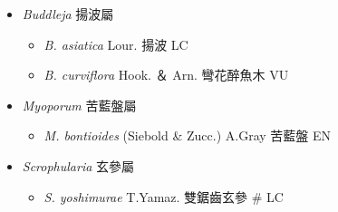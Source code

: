 
  \begin{itemize}
 \item[] \textit{Buddleja} 揚波屬
                                
  \begin{itemize}
        \item[] \textit{B. asiatica} Lour.  揚波   LC
        \item[] \textit{B. curviflora} Hook. ＆ Arn.  彎花醉魚木   VU
  \end{itemize}
 \item[] \textit{Myoporum} 苦藍盤屬
                                
  \begin{itemize}
        \item[] \textit{M. bontioides} (Siebold \& Zucc.) A.Gray  苦藍盤   EN
  \end{itemize}
 \item[] \textit{Scrophularia} 玄參屬
                                
  \begin{itemize}
        \item[] \textit{S. yoshimurae} T.Yamaz.  雙鋸齒玄參  \# LC
  \end{itemize}
  \end{itemize}
